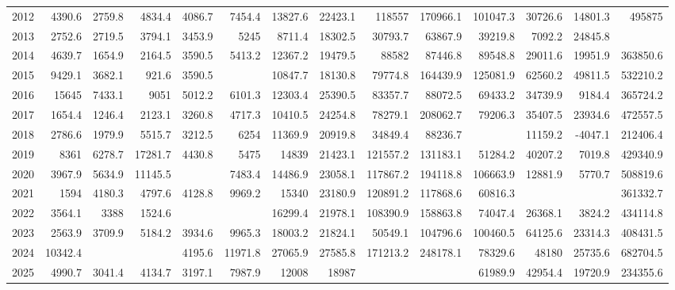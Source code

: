 \begin{longtable}[t]{crrrrrrrrrrrrr}
2012 & 4390.6 & 2759.8 & 4834.4 & 4086.7 & 7454.4 & 13827.6 & 22423.1 & 118557 & 170966.1 & 101047.3 & 30726.6 & 14801.3 & 495875\\
2013 & 2752.6 & 2719.5 & 3794.1 & 3453.9 & 5245 & 8711.4 & 18302.5 & 30793.7 & 63867.9 & 39219.8 & 7092.2 & 24845.8 & \cellcolor{green}{210798.5}\\
2014 & 4639.7 & 1654.9 & 2164.5 & 3590.5 & 5413.2 & 12367.2 & 19479.5 & 88582 & 87446.8 & 89548.8 & 29011.6 & 19951.9 & 363850.6\\
2015 & 9429.1 & 3682.1 & 921.6 & 3590.5 & \cellcolor{green}{3940.3} & 10847.7 & 18130.8 & 79774.8 & 164439.9 & 125081.9 & 62560.2 & 49811.5 & 532210.2\\
2016 & 15645 & 7433.1 & 9051 & 5012.2 & 6101.3 & 12303.4 & 25390.5 & 83357.7 & 88072.5 & 69433.2 & 34739.9 & 9184.4 & 365724.2\\
2017 & 1654.4 & 1246.4 & 2123.1 & 3260.8 & 4717.3 & 10410.5 & 24254.8 & 78279.1 & 208062.7 & 79206.3 & 35407.5 & 23934.6 & 472557.5\\
2018 & 2786.6 & 1979.9 & 5515.7 & 3212.5 & 6254 & 11369.9 & 20919.8 & 34849.4 & 88236.7 & \cellcolor{green}{30169.7} & 11159.2 & -4047.1 & 212406.4\\
2019 & 8361 & 6278.7 & 17281.7 & 4430.8 & 5475 & 14839 & 21423.1 & 121557.2 & 131183.1 & 51284.2 & 40207.2 & 7019.8 & 429340.9\\
2020 & 3967.9 & 5634.9 & 11145.5 & \cellcolor{red}{5740.4} & 7483.4 & 14486.9 & 23058.1 & 117867.2 & 194118.8 & 106663.9 & 12881.9 & 5770.7 & 508819.6\\
2021 & 1594 & 4180.3 & 4797.6 & 4128.8 & 9969.2 & 15340 & 23180.9 & 120891.2 & 117868.6 & 60816.3 & \cellcolor{green}{5718.7} & \cellcolor{green}{-7152.8} & 361332.7\\
2022 & 3564.1 & 3388 & 1524.6 & \cellcolor{green}{3171.5} & \cellcolor{red}{12694.7} & 16299.4 & 21978.1 & 108390.9 & 158863.8 & 74047.4 & 26368.1 & 3824.2 & 434114.8\\
2023 & 2563.9 & 3709.9 & 5184.2 & 3934.6 & 9965.3 & 18003.2 & 21824.1 & 50549.1 & 104796.6 & 100460.5 & 64125.6 & 23314.3 & 408431.5\\
2024 & 10342.4 & \cellcolor{red}{11543.1} & \cellcolor{red}{18363.4} & 4195.6 & 11971.8 & 27065.9 & 27585.8 & 171213.2 & 248178.1 & 78329.6 & 48180 & 25735.6 & 682704.5\\
2025 & 4990.7 & 3041.4 & 4134.7 & 3197.1 & 7987.9 & 12008 & 18987 & \cellcolor{green}{21995.4} & \cellcolor{green}{33348.3} & 61989.9 & 42954.4 & 19720.9 & 234355.6\\

\end{longtable}
